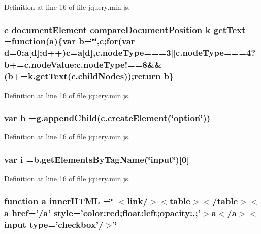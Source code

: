 Definition at line 16 of file jquery.\-min.\-js.

\subsubsection[{get\-Text}]{\setlength{\rightskip}{0pt plus 5cm}c document\-Element compare\-Document\-Position {\bf k} get\-Text =function({\bf a})\{var {\bf b}=\char`\"{}\char`\"{},c;{\bf for}(var d=0;{\bf a}[d];d++)c={\bf a}[d],c.\-node\-Type===3$|$$|$c.\-node\-Type===4?{\bf b}+=c.\-node\-Value\-:c.\-node\-Type!==8\&\&({\bf b}+=k.\-get\-Text(c.\-child\-Nodes));return {\bf b}\}}\label{jquery_8min_8js_aa05b4ea2cef4ea4ec861b8f7227da3c9}


Definition at line 16 of file jquery.\-min.\-js.

\subsubsection[{h}]{\setlength{\rightskip}{0pt plus 5cm}var h =g.\-append\-Child(c.\-create\-Element(\char`\"{}option\char`\"{}))}\label{jquery_8min_8js_a79fe0eb780a2a4b5543b4dddf8b6188a}


Definition at line 16 of file jquery.\-min.\-js.

\subsubsection[{i}]{\setlength{\rightskip}{0pt plus 5cm}var i =b.\-get\-Elements\-By\-Tag\-Name(\char`\"{}input\char`\"{})[0]}\label{jquery_8min_8js_a5e25b1d1bed9ab5f3174b76d6a722180}


Definition at line 16 of file jquery.\-min.\-js.

\subsubsection[{inner\-H\-T\-M\-L}]{\setlength{\rightskip}{0pt plus 5cm}function {\bf a} inner\-H\-T\-M\-L =\char`\"{} $<$link/$>$$<$table$>$$<$/table$>$$<${\bf a} href='/{\bf a}' style='color\-:red;float\-:left;opacity\-:.;'$>${\bf a}$<$/{\bf a}$>$$<$input {\bf type}='checkbox'/$>$\char`\"{}}\label{jquery_8min_8js_a9ee0cc65c81108e1a2e35fd96d10081a}


